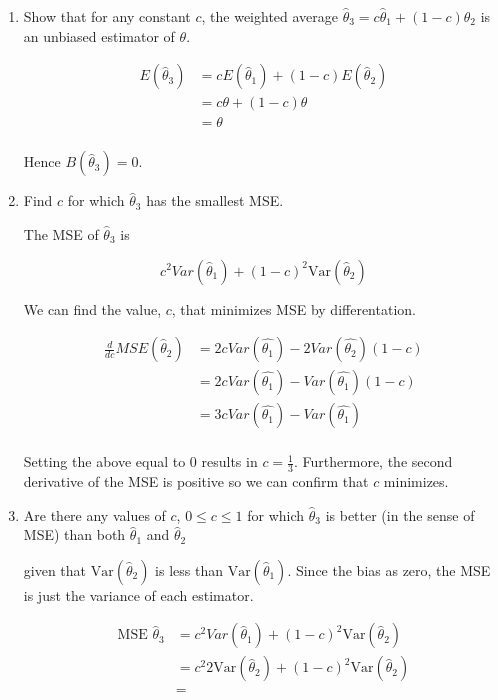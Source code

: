 \documentclass{tufte-book}
\newcommand{\Var}{\mathrm{Var}}
\theoremstyle{mytheoremstyle}
\theoremstyle{mylemstyle}
\theoremstyle{mydefstyle}
\begin{document}
\begin{enumerate}

\item Show that for any constant $c$, the weighted average $\hat{\theta}_3 = c\hat{\theta}_1 + (1-c)\hat{\theta}_2$ is an unbiased estimator of $\theta$.

\begin{align*}
E(\hat{\theta}_3) &= cE(\hat{\theta}_1) + (1-c)E(\hat{\theta}_2)\\
&= c\theta + (1-c)\theta\\
&= \theta\\
\end{align*}

Hence $B(\hat{\theta}_3) = 0$.

\item Find $c$ for which $\hat{\theta}_3$ has the smallest MSE.

The MSE of $\hat{\theta}_3$ is

\[ c^2Var(\hat{\theta}_1) + (1-c)^2\Var(\hat{\theta}_2) \]

We can find the value, $c$, that minimizes MSE by differentation.

\begin{align*}
\frac{d}{dc} MSE(\hat{\theta}_2) &= 2cVar(\hat{\theta_1}) - 2Var(\hat{\theta_2})(1-c)\\
&= 2cVar(\hat{\theta_1}) - Var(\hat{\theta_1})(1-c)\\
&= 3cVar(\hat{\theta_1}) - Var(\hat{\theta_1})\\
\end{align*}

Setting the above equal to $0$ results in $c=\frac{1}{3}$.  Furthermore, the second derivative of the MSE is positive so we can confirm that $c$ minimizes.

\item Are there any values of $c$, $0 \leq c \leq 1$ for which $\hat{\theta}_3$ is better (in the sense of MSE) than both $\hat{\theta}_1$ and $\hat{\theta}_2$

 given that $\Var(\hat{\theta}_2)$ is less than $\Var(\hat{\theta}_1)$.  Since the bias as zero, the MSE is just the variance of each estimator.

\begin{align*}
\text{MSE }\hat{\theta}_3 &= c^2Var(\hat{\theta}_1) + (1-c)^2\Var(\hat{\theta}_2)\\
&= c^2 2\Var(\hat{\theta}_2) + (1-c)^2\Var(\hat{\theta}_2)\\
&=
\end{align*}

\end{enumerate}
\end{document}
